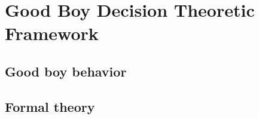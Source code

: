 \chapter{Good Boy Decision Theoretic Framework} \label{chapter:framework}

\section{Good boy behavior}

\blindtext

\section{Formal theory}

\Blindtext